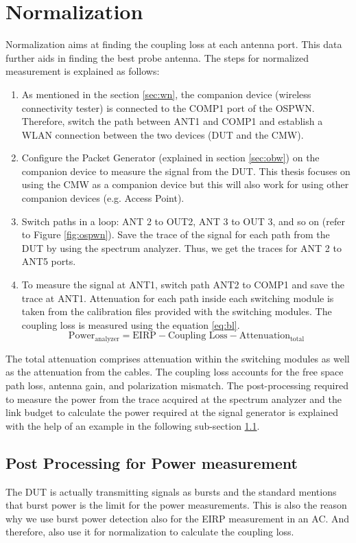 \section{Normalization} \label{sec:11}
Normalization aims at finding the coupling loss at each antenna port. This data further aids in finding the best probe antenna. The steps for normalized measurement is explained as follows:
\begin{enumerate}
\item As mentioned in the section \ref{sec:wn}, the companion device (wireless connectivity tester) is connected to the COMP1 port of the OSPWN. Therefore, switch the path between ANT1 and COMP1 and establish a \acs{WLAN} connection between the two devices (\acs{DUT} and the \acs{CMW}). 
\item Configure the Packet Generator (explained in section \ref{sec:obw}) on the companion device to measure the signal from the \acs{DUT}. This thesis focuses on using the CMW as a companion device but this will also work for using other companion devices (e.g. Access Point).
\item Switch paths in a loop: ANT 2 to OUT2, ANT 3 to OUT 3, and so on (refer to Figure \ref{fig:ospwn}). Save the trace of the signal for each path from the \acs{DUT} by using the spectrum analyzer. Thus, we get the traces for ANT 2 to ANT5 ports.
\item To measure the signal at ANT1, switch path ANT2 to COMP1 and save the trace at ANT1. Attenuation for each path inside each switching module is taken from the calibration files provided with the switching modules. The coupling loss is measured using the equation \ref{eq:bl}.
\begin{equation}
\mbox{Power}_{\mbox{analyzer}}  = \mbox{EIRP} - \mbox{Coupling Loss} - \mbox{Attenuation}_{\mbox{total}}  \label{eq:bl}
\end{equation}
\end{enumerate}
The total attenuation comprises attenuation within the switching modules as well as the attenuation from the cables. The coupling loss accounts for the free space path loss, antenna gain, and polarization mismatch. The post-processing required to measure the power from the trace acquired at the spectrum analyzer and the link budget to calculate the power required at the signal generator is explained with the help of an example in the following sub-section \ref{sec:abc}.

\subsection{Post Processing for Power measurement} \label{sec:abc}
The \acs{DUT} is actually transmitting signals as bursts and the standard mentions that burst power is the limit for the power measurements. This is also the reason why we use burst power detection also for the \acs{EIRP} measurement in an \acf{AC}. And therefore, also use it for normalization to calculate the coupling loss. \\

